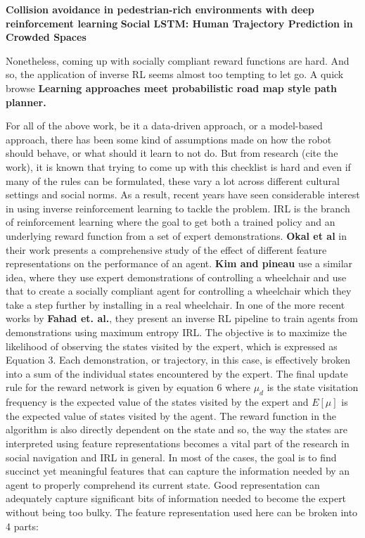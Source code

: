 \textbf{Collision avoidance in pedestrian-rich environments with deep reinforcement learning}
\textbf{Social LSTM: Human Trajectory Prediction in Crowded Spaces}

Nonetheless, coming up with socially compliant reward functions are hard. And so, the application of inverse RL seems almost too tempting to let go. A quick browse 
\textbf{Learning approaches meet probabilistic road map style path planner.}


For all of the above work, be it a data-driven approach, or a model-based approach, there has been some kind of assumptions made on how the robot should behave, or what should it learn to not do. But from research (cite the work), it is known that trying to come up with this checklist is hard and even if many of the rules can be formulated, these vary a lot across different cultural settings and social norms. As a result, recent years have seen considerable interest in using inverse reinforcement learning to tackle the problem. IRL is the branch of reinforcement learning where the goal to get both a trained policy and an underlying reward function from a set of expert demonstrations.
\textbf{Okal et al} in their work presents a comprehensive study of the effect of different feature representations on the performance of an agent.
\textbf{Kim and pineau} use a similar idea, where they use expert demonstrations of controlling a wheelchair and use that to create a socially compliant agent for controlling a wheelchair which they take a step further by installing in a real wheelchair. 
In one of the more recent works by \textbf{Fahad et. al.}, they present an inverse RL pipeline to train agents from demonstrations using maximum entropy IRL.
The objective is to maximize the likelihood of observing the states visited by the expert, which is expressed as Equation 3.
Each demonstration, or trajectory, in this case, is effectively broken into a sum of the individual states encountered by the expert. The final update rule for the reward network is given by equation 6 
where $\mu_{d}$ is the state visitation frequency is the expected value of the states visited by the expert and $E[\mu]$ is the expected value of states visited by the agent. The reward function in the algorithm is also directly dependent on the state and so, the way the states are interpreted using feature representations becomes a vital part of the research in social navigation and IRL in general. 
In most of the cases, the goal is to find succinct yet meaningful features that can capture the information needed by an agent to properly comprehend its current state. Good representation can adequately capture significant bits of information needed to become the expert without being too bulky.  The feature representation used here can be broken into 4 parts:

